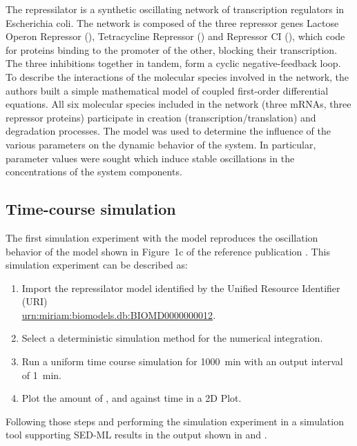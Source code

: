 The repressilator is a synthetic oscillating network of transcription regulators in Escherichia coli. The network is composed of the three repressor genes Lactose Operon Repressor (), Tetracycline Repressor () and Repressor CI (), which code for proteins binding to the promoter of the other, blocking their transcription. The three inhibitions together in tandem, form a cyclic negative-feedback loop. To describe the interactions of the molecular species involved in the network, the authors built a simple mathematical model of coupled first-order differential equations. All six molecular species included in the network (three mRNAs, three repressor proteins) participate in creation (transcription/translation) and degradation processes. The model was used to determine the influence of the various parameters on the dynamic behavior of the system. In particular, parameter values were sought which induce stable oscillations in the concentrations of the system components.

\subsection{Time-course simulation}
\label{sec:timecourse}
The first simulation experiment with the model reproduces the oscillation behavior of the model shown in Figure~1c of the reference publication \citep{Elowitz:2000}. This simulation experiment can be described as:

\begin{enumerate}
 	\item{Import the repressilator model identified by the Unified Resource Identifier (URI) \citep{Berners-Lee:2005}\\ 	\url{urn:miriam:biomodels.db:BIOMD0000000012}.}
 	\item {Select a deterministic simulation method for the numerical integration.}
 	\item{Run a uniform time course simulation for 1000~min with an output interval of 1~min.}
 	\item{Plot the amount of ,  and  against time in a 2D Plot.}
 \end{enumerate}

Following those steps and performing the simulation experiment in a simulation tool supporting SED-ML results in the output shown in  and .

